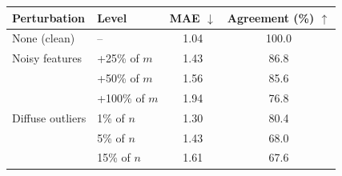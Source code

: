\begin{tabular}{l l c c}
\toprule
Perturbation & Level & MAE $\downarrow$ & Agreement (\%) $\uparrow$ \\
\midrule
None (clean) & -- & 1.04 & 100.0 \\
\midrule
Noisy features & +25\% of $m$ & 1.43 & 86.8 \\
 & +50\% of $m$ & 1.56 & 85.6 \\
 & +100\% of $m$ & 1.94 & 76.8 \\
\midrule
Diffuse outliers & 1\% of $n$ & 1.30 & 80.4 \\
 & 5\% of $n$ & 1.43 & 68.0 \\
 & 15\% of $n$ & 1.61 & 67.6 \\
\bottomrule
\end{tabular}
